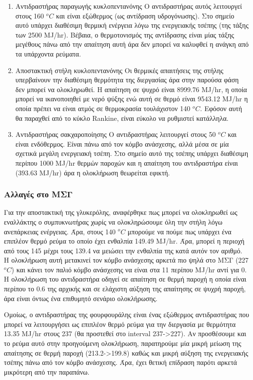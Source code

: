 \documentclass[11pt]{article}
\begin{document}
\begin{enumerate}
\item Αντιδραστήρας παραγωγής κυκλοπεντανόνης
\label{sec:org9b44a69}
Ο αντιδραστήρας αυτός λειτουργεί στους 160 \(^oC\) και είναι εξώθερμος (ως αντίδραση υδρογόνωσης). Στο σημείο αυτό υπάρχει διαθέσιμη θερμική ενέργεια λόγω της ενεργειακής τσέπης (της τάξης των 2500 MJ/hr). Βέβαια, ο θερμοτονισμός της αντίδρασης είναι μίας τάξης μεγέθους πάνω από την απαίτηση αυτή άρα δεν μπορεί να καλυφθεί η ανάγκη από τα υπάρχοντα ρεύματα.
\item Αποστακτική στήλη κυκλοπεντανόνης
\label{sec:org08af8eb}
Οι θερμικές απαιτήσεις της στήλης υπερβαίνουν την διαθέσιμη θερμότητα της διεργασίας άρα στην παρούσα φάση δεν μπορεί να ολοκληρωθεί. Η απαίτηση σε ψυχρό είναι 8999.76 MJ/hr, η οποία μπορεί να ικανοποιηθεί με νερό ψύξης ενώ αυτή σε θερμό είναι 9543.12 MJ/hr η οποία πρέπει να είναι ατμός σε θερμοκρασία τουλάχιστον 140 \(^oC\). Εφόσον αυτή θα παραχθεί από το κύκλο Rankine, είναι εύκολο να ρυθμιστεί κατάλληλα.
\item Αντιδραστήρας σακχαροποίησης
\label{sec:orgb1d0545}
Ο αντιδραστήρας λειτουργεί στους 50 \(^oC\) και είναι ενδόθερμος. Είναι πάνω από τον κόμβο ανάσχεσης, αλλά μέσα σε μία σχετικά μεγάλη ενεργειακή τσέπη. Στο σημείο αυτό της τσέπης υπάρχει διαθέσιμη περίπου 1000 MJ/hr θερμών παροχών και η απαίτηση του αντιδραστήρα είναι (393.63 MJ/hr) άρα η ολοκλήρωση θεωρείται εφικτή.
\end{enumerate}

\subsubsection{Αλλαγές στο ΜΣΓ}
\label{sec:org23f3851}
Για την αποστακτική της γλυκερόλης, αναφέρθηκε πως μπορεί να ολοκληρωθεί ως εναλλάκτης ο συμπυκνωτήρας χωρίς να ολοκληρώσουμε όλη την στήλη λόγω ανεπάρκειας ενέργειας. Άρα, στους 140 \(^oC\) μπορούμε να πούμε πως υπάρχει ένα επιπλέον θερμό ρεύμα το οποίο έχει ενθαλπία 149.49 MJ/hr. Άρα, μπορεί η περιοχή από τους 145 μέχρι τους 139.4 να μειώσει την ενθαλπία της κατά αυτόν τον αριθμό. Η ολοκλήρωση αυτή μετακινεί τον κόμβο ανάσχεσης αρκετά πιο ψηλά στο ΜΣΓ (227 \(^oC\)) και κάνει τον παλιό κόμβο ανάσχεσης να είναι στα 11 περίπου MJ/hr αντί για 0. Η ολοκλήρωση του αντιδραστήρα οδηγεί σε απαίτηση σε θερμή παροχή η οποία είναι περίπου το 0.6 της αρχικής και σε ελάχιστη αύξηση της απαίτησης σε ψυχρή παροχή, άρα είναι όντως ένα επιθυμητό σενάριο ολοκλήρωσης.

Ομοίως, ο αντιδραστήρας της φουρφουράλης είναι ένας εξώθερμος αντιδραστήρας που μπορεί να λειτουργήσει ως επιπλέον θερμό ρεύμα για την διεργασία με θερμότητα 13.35 MJ/hr στους 237 (θα προστεθεί στο interval 237->227). Αν προσθέσουμε και το ρεύμα αυτό στην προηγούμενη ολοκλήρωση, παρατηρούμε μία μικρή μείωση της απαίτησης σε θερμή παροχή (213.2->199.8) καθώς και μικρή αύξηση της ενεργειακής τσέπης πάνω από τον κόμβο ανάσχεσης. Άρα, έχει θετική επίδραση παρότι αρκετά μικρότερη από την παραπάνω.
\end{document}

